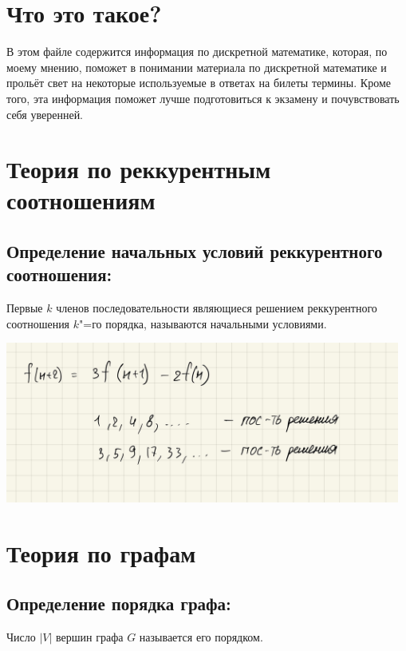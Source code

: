 \documentclass[14pt]{extarticle}
\begin{document}
\tableofcontents

\newpage

\section{Что это такое?}

В этом файле содержится информация по дискретной математике,
которая, по моему мнению, поможет в понимании материала по дискретной
математике и прольёт свет на некоторые используемые в ответах на билеты
термины. Кроме того, эта информация поможет лучше подготовиться к экзамену
и почувствовать себя уверенней.

\section{Теория по реккурентным соотношениям}

\subsection{Определение начальных условий реккурентного соотношения:}

Первые $k$ членов последовательности являющиеся решением реккурентного 
соотношения $k$"=го порядка, называются начальными условиями.

\begin{center}
    \includegraphics[width=130mm]{"2.1.1.png"}
\end{center}

\section{Теория по графам}

\subsection{Определение порядка графа:}

Число $|V|$ вершин графа $G$ называется его порядком.
\end{document}
